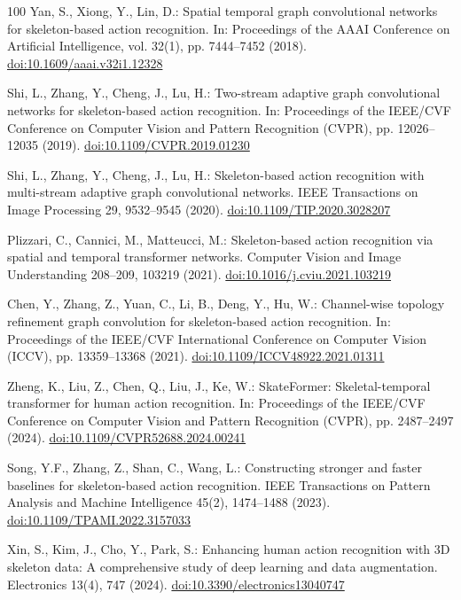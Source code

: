 \documentclass[runningheads]{llncs}
\begin{document}
\begin{thebibliography}{100}
Yan, S., Xiong, Y., Lin, D.: Spatial temporal graph convolutional networks for skeleton-based action recognition. In: Proceedings of the AAAI Conference on Artificial Intelligence, vol. 32(1), pp. 7444--7452 (2018). \href{https://doi.org/10.1609/aaai.v32i1.12328}{doi:10.1609/aaai.v32i1.12328}

Shi, L., Zhang, Y., Cheng, J., Lu, H.: Two-stream adaptive graph convolutional networks for skeleton-based action recognition. In: Proceedings of the IEEE/CVF Conference on Computer Vision and Pattern Recognition (CVPR), pp. 12026--12035 (2019). \href{https://doi.org/10.1109/CVPR.2019.01230}{doi:10.1109/CVPR.2019.01230}

Shi, L., Zhang, Y., Cheng, J., Lu, H.: Skeleton-based action recognition with multi-stream adaptive graph convolutional networks. IEEE Transactions on Image Processing 29, 9532--9545 (2020). \href{https://doi.org/10.1109/TIP.2020.3028207}{doi:10.1109/TIP.2020.3028207}

Plizzari, C., Cannici, M., Matteucci, M.: Skeleton-based action recognition via spatial and temporal transformer networks. Computer Vision and Image Understanding 208--209, 103219 (2021). \href{https://doi.org/10.1016/j.cviu.2021.103219}{doi:10.1016/j.cviu.2021.103219}

Chen, Y., Zhang, Z., Yuan, C., Li, B., Deng, Y., Hu, W.: Channel-wise topology refinement graph convolution for skeleton-based action recognition. In: Proceedings of the IEEE/CVF International Conference on Computer Vision (ICCV), pp. 13359--13368 (2021). \href{https://doi.org/10.1109/ICCV48922.2021.01311}{doi:10.1109/ICCV48922.2021.01311}

Zheng, K., Liu, Z., Chen, Q., Liu, J., Ke, W.: SkateFormer: Skeletal-temporal transformer for human action recognition. In: Proceedings of the IEEE/CVF Conference on Computer Vision and Pattern Recognition (CVPR), pp. 2487--2497 (2024). \href{https://doi.org/10.1109/CVPR52688.2024.00241}{doi:10.1109/CVPR52688.2024.00241}

Song, Y.F., Zhang, Z., Shan, C., Wang, L.: Constructing stronger and faster baselines for skeleton-based action recognition. IEEE Transactions on Pattern Analysis and Machine Intelligence 45(2), 1474--1488 (2023). \href{https://doi.org/10.1109/TPAMI.2022.3157033}{doi:10.1109/TPAMI.2022.3157033}

Xin, S., Kim, J., Cho, Y., Park, S.: Enhancing human action recognition with 3D skeleton data: A comprehensive study of deep learning and data augmentation. Electronics 13(4), 747 (2024). \href{https://doi.org/10.3390/electronics13040747}{doi:10.3390/electronics13040747}


\end{thebibliography}
\end{document}
